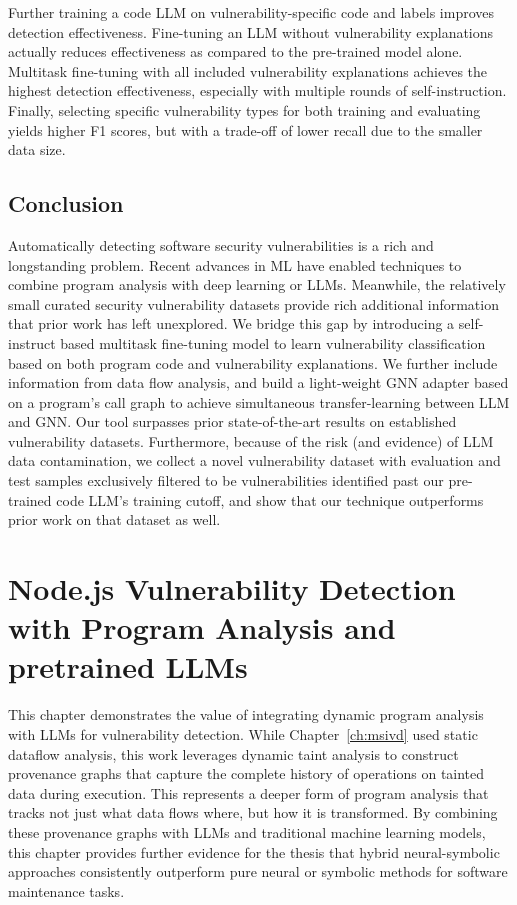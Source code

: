 \documentclass[12pt,openany,oneside,table]{cmuthesis}
\begin{document}
\begin{tcolorbox}
[colback=white,colframe=black,arc=0pt,boxrule=0.5pt,title=RQ3 Summary,boxsep=2pt,left=1pt,right=1pt,top=1pt,bottom=1pt,fonttitle=\bfseries]
Further training a code LLM on vulnerability-specific code and labels improves detection effectiveness. Fine-tuning an LLM without vulnerability explanations actually reduces effectiveness as compared to the pre-trained model alone. Multitask fine-tuning with all included vulnerability explanations achieves the highest detection effectiveness, especially with multiple rounds of self-instruction. Finally, selecting specific vulnerability types for both training and evaluating yields higher F1 scores, but with a trade-off of lower recall due to the smaller data size.
\end{tcolorbox}

\section{Conclusion}
Automatically detecting software security vulnerabilities is a rich and longstanding problem. Recent advances in ML have enabled techniques to combine program analysis with deep learning or LLMs.
Meanwhile, the relatively small curated security vulnerability datasets provide rich additional information that prior work has left unexplored. We bridge this gap by introducing a self-instruct based multitask fine-tuning model to learn vulnerability classification based on both program code and vulnerability explanations. We further include information from data flow analysis, and build a light-weight GNN adapter based on a program's call graph to achieve simultaneous transfer-learning between LLM and GNN. 
Our tool surpasses prior state-of-the-art results on established vulnerability datasets. Furthermore, because of the risk (and evidence) of LLM data contamination, we collect a novel vulnerability dataset with evaluation and test samples  exclusively filtered to be vulnerabilities identified past our pre-trained code LLM's training cutoff, and show that our technique outperforms prior work on that dataset as well. 

\chapter{Node.js Vulnerability Detection with Program Analysis and pretrained LLMs}
\label{ch:nodejs}

This chapter demonstrates the value of integrating dynamic program analysis with LLMs for vulnerability detection. While Chapter~\ref{ch:msivd} used static dataflow analysis, this work leverages dynamic taint analysis to construct provenance graphs that capture the complete history of operations on tainted data during execution. This represents a deeper form of program analysis that tracks not just what data flows where, but how it is transformed. By combining these provenance graphs with LLMs and traditional machine learning models, this chapter provides further evidence for the thesis that hybrid neural-symbolic approaches consistently outperform pure neural or symbolic methods for software maintenance tasks.
\end{document}
